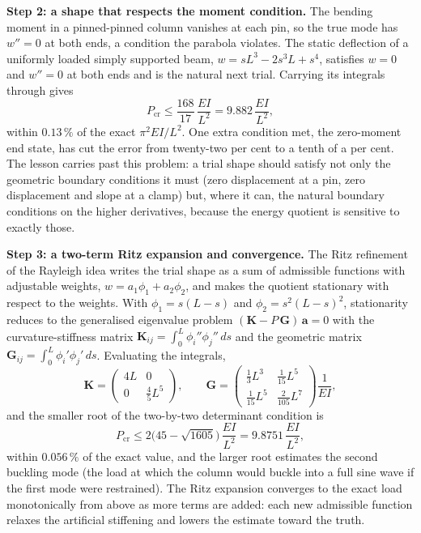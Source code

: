 \textbf{Step 2: a shape that respects the moment condition.} The bending
moment in a pinned-pinned column vanishes at each pin, so the true mode has
$w'' = 0$ at both ends, a condition the parabola violates. The static
deflection of a uniformly loaded simply supported beam, $w = sL^3 - 2s^3 L +
s^4$, satisfies $w = 0$ and $w'' = 0$ at both ends and is the natural next
trial. Carrying its integrals through gives
\[
P_\text{cr} \le \frac{168}{17}\,\frac{EI}{L^2} = 9.882\,\frac{EI}{L^2},
\]
within $0.13\,\%$ of the exact $\pi^2 EI/L^2$. One extra condition met, the
zero-moment end state, has cut the error from twenty-two per cent to a
tenth of a per cent. The lesson carries past this problem: a trial shape
should satisfy not only the geometric boundary conditions it must (zero
displacement at a pin, zero displacement and slope at a clamp) but, where it
can, the natural boundary conditions on the higher derivatives, because the
energy quotient is sensitive to exactly those.

\textbf{Step 3: a two-term Ritz expansion and convergence.} The Ritz
refinement of the Rayleigh idea writes the trial shape as a sum of admissible
functions with adjustable weights, $w = a_1\phi_1 + a_2\phi_2$, and makes the
quotient stationary with respect to the weights. With $\phi_1 = s(L-s)$ and
$\phi_2 = s^2(L-s)^2$, stationarity reduces to the generalised eigenvalue
problem $(\mathbf{K} - P\,\mathbf{G})\,\mathbf{a} = 0$ with the
curvature-stiffness matrix $\mathbf{K}_{ij} = \int_0^L \phi_i''\phi_j''\,ds$
and the geometric matrix $\mathbf{G}_{ij} = \int_0^L \phi_i'\phi_j'\,ds$.
Evaluating the integrals,
\[
\mathbf{K} = \begin{pmatrix} 4L & 0 \\ 0 & \tfrac45 L^5 \end{pmatrix},
\qquad
\mathbf{G} = \begin{pmatrix} \tfrac13 L^3 & \tfrac{1}{15} L^5 \\[2pt]
\tfrac{1}{15} L^5 & \tfrac{2}{105} L^7 \end{pmatrix}
\frac{1}{EI},
\]
and the smaller root of the two-by-two determinant condition is
\[
P_\text{cr} \le 2\bigl(45 - \sqrt{1605}\bigr)\,\frac{EI}{L^2}
= 9.8751\,\frac{EI}{L^2},
\]
within $0.056\,\%$ of the exact value, and the larger root estimates the
second buckling mode (the load at which the column would buckle into a full
sine wave if the first mode were restrained). The Ritz expansion converges
to the exact load monotonically from above as more terms are added: each new
admissible function relaxes the artificial stiffening and lowers the
estimate toward the truth.


